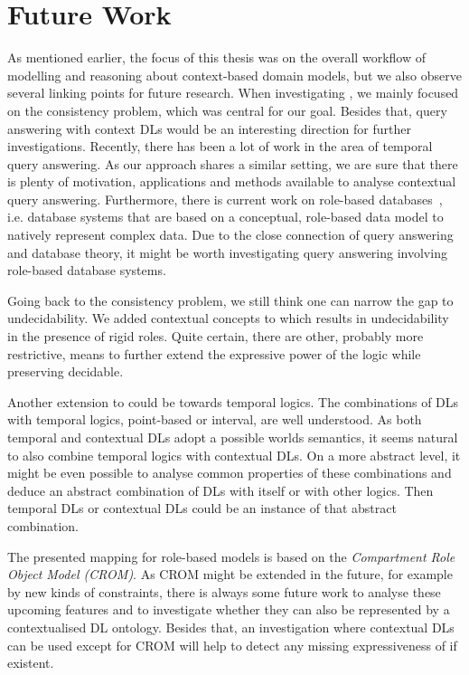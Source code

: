 \section{Future Work}
\label{sec:future-work}

As mentioned earlier, the focus of this thesis was on the overall workflow of modelling and
reasoning about context-based domain models, but we also observe several linking points for future
research. When investigating \LMLO, we mainly focused on the consistency problem, which was central
for our goal. Besides that, query answering with context DLs would be an interesting direction for
further investigations. Recently, there has been a lot of work in the area of temporal query
answering. As our approach shares a similar setting, we are sure that there is plenty of motivation,
applications and methods available to analyse contextual query answering. Furthermore, there is
current work on role-based databases~\cite{JaKV-ADBIS16}, i.e. database systems that are based on a
conceptual, role-based data model to natively represent complex data. Due to the close connection of
query answering and database theory, it might be worth investigating query answering involving
role-based database systems.

Going back to the consistency problem, we still think one can narrow the gap to undecidability. We
added contextual concepts to \LMLO which results in undecidability in the presence of rigid
roles. Quite certain, there are other, probably more restrictive, means to further extend the
expressive power of the logic while preserving decidable.

Another extension to \LMLO could be towards temporal logics. The combinations of DLs with
temporal logics, point-based or interval, are well understood. As both temporal and contextual DLs
adopt a possible worlds semantics, it seems natural to also combine temporal logics with contextual
DLs. On a more abstract level, it might be even possible to analyse common properties of these
combinations and deduce an abstract combination of DLs with itself or with other logics. Then
temporal DLs or contextual DLs could be an instance of that abstract combination.

The presented mapping for role-based models is based on the \emph{Compartment Role Object Model
  (CROM)}. As CROM might be extended in the future, for example by new kinds of constraints,
there is always some future work to analyse these upcoming features and to investigate whether they can
also be represented by a contextualised DL ontology.  Besides that, an investigation where contextual
DLs can be used except for CROM will help to detect any missing expressiveness of \LMLO if existent.

